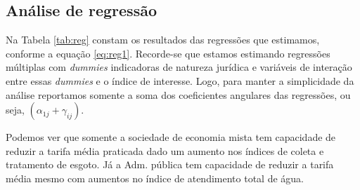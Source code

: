 






\begin{multicols}{2}
\subsection{Análise de regressão}

Na Tabela \ref{tab:reg} constam os resultados das regressões que estimamos, conforme a equação \ref{eq:reg1}. Recorde-se que estamos estimando regressões múltiplas com \textit{dummies} indicadoras de natureza jurídica e variáveis de interação entre essas \textit{dummies} e o índice de interesse. Logo, para manter a simplicidade da análise reportamos somente a soma dos coeficientes angulares das regressões, ou seja, $(\alpha_{1j} + \gamma_{ij} )$.

Podemos ver que somente a sociedade de economia mista tem capacidade de reduzir a tarifa média praticada dado um aumento nos índices de coleta e tratamento de esgoto.
Já a Adm. pública tem capacidade de reduzir a tarifa média mesmo com aumentos no índice de atendimento total de água.


\end{multicols}



